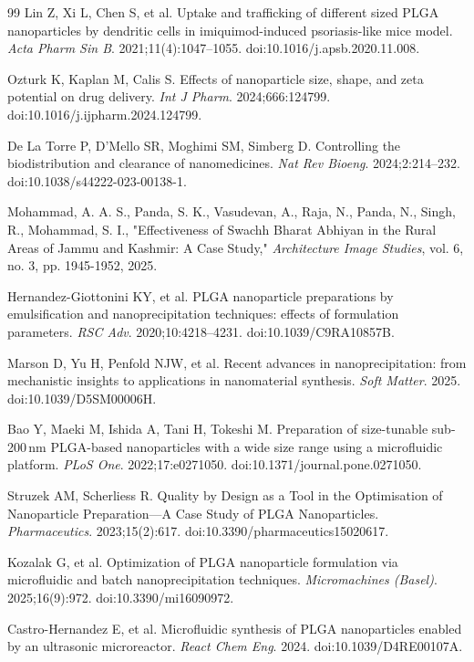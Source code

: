\documentclass[10pt]{NSP1}
\begin{document}
\begin{thebibliography}{99}
 Lin Z, Xi L, Chen S, et al. Uptake and trafficking of different sized PLGA
nanoparticles by dendritic cells in imiquimod-induced psoriasis-like mice model.
\textit{Acta Pharm Sin B}. 2021;11(4):1047--1055. doi:10.1016/j.apsb.2020.11.008.

 Ozturk K, Kaplan M, Calis S. Effects of nanoparticle size, shape, and zeta
potential on drug delivery. \textit{Int J Pharm}. 2024;666:124799.
doi:10.1016/j.ijpharm.2024.124799.

 De La Torre P, D'Mello SR, Moghimi SM, Simberg D. Controlling the biodistribution
and clearance of nanomedicines. \textit{Nat Rev Bioeng}. 2024;2:214--232.
doi:10.1038/s44222-023-00138-1.

Mohammad, A. A. S., Panda, S. K., Vasudevan, A., Raja, N., Panda, N., Singh, R., Mohammad, S. I., "Effectiveness of Swachh Bharat Abhiyan in the Rural Areas of Jammu and Kashmir: A Case Study," \emph{Architecture Image Studies}, vol. 6, no. 3, pp. 1945-1952, 2025.


 Hernandez-Giottonini KY, et al. PLGA nanoparticle preparations by emulsification
and nanoprecipitation techniques: effects of formulation parameters. \textit{RSC Adv}.
2020;10:4218--4231. doi:10.1039/C9RA10857B.

 Marson D, Yu H, Penfold NJW, et al. Recent advances in nanoprecipitation: from
mechanistic insights to applications in nanomaterial synthesis. \textit{Soft Matter}. 2025.
doi:10.1039/D5SM00006H.

 Bao Y, Maeki M, Ishida A, Tani H, Tokeshi M. Preparation of size-tunable
sub-200\,nm PLGA-based nanoparticles with a wide size range using a microfluidic platform.
\textit{PLoS One}. 2022;17:e0271050. doi:10.1371/journal.pone.0271050.

 Struzek AM, Scherliess R. Quality by Design as a Tool in the Optimisation of
Nanoparticle Preparation---A Case Study of PLGA Nanoparticles. \textit{Pharmaceutics}.
2023;15(2):617. doi:10.3390/pharmaceutics15020617.

 Kozalak G, et al. Optimization of PLGA nanoparticle formulation via microfluidic
and batch nanoprecipitation techniques. \textit{Micromachines (Basel)}. 2025;16(9):972.
doi:10.3390/mi16090972.

 Castro-Hernandez E, et al. Microfluidic synthesis of PLGA nanoparticles enabled by
an ultrasonic microreactor. \textit{React Chem Eng}. 2024. doi:10.1039/D4RE00107A.


\end{thebibliography}
\end{document}
